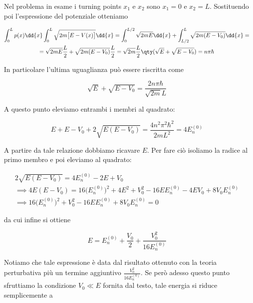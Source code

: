 \begin{soluzione}
   Nel problema in esame i turning points $x_1$ e $x_2$ sono $x_1=0$ e $x_2=L$. Sostituendo poi l'espressione del potenziale otteniamo
   
   \begin{gather*}
      \int_{0}^{L} p(x) \dd{x}
      \int_{0}^{L} \sqrt{2m \bigl[ E - V(x) \bigr]} \dd{x}
      =\int_{0}^{L/2} \sqrt{2mE} \dd{x} + \int_{L/2}^{L} \sqrt{2m(E - V_0)} \dd{x}
      =\\
      =\sqrt{2mE} \frac{L}{2} + \sqrt{2m(E - V_0)} \frac{L}{2}
      =\sqrt{2m} \frac{L}{2} \qty( \sqrt{E} + \sqrt{E - V_0} )
      =n \pi \hbar
   \end{gather*}

   In particolare l'ultima uguaglianza può essere riscritta come

   \begin{equation*}
      \sqrt{E} + \sqrt{E - V_0}
      =\frac{2 n \pi \hbar}{\sqrt{2m} L}
   \end{equation*}

   A questo punto eleviamo entrambi i membri al quadrato:

   \begin{equation*}
      E + E - V_0 + 2\sqrt{E(E - V_0)}
      =\frac{4 n^2 \pi^2 \hbar^2}{2 m L^2}
      =4 E_n^{(0)}
   \end{equation*}

   A partire da tale relazione dobbiamo ricavare $E$. Per fare ciò isoliamo la radice al primo membro e poi eleviamo al quadrato:

   \begin{gather*}
      2\sqrt{E(E - V_0)}
      =4 E_n^{(0)} - 2E + V_0
      \\
      \implies
      4E(E - V_0)
      =16 \bigl( E_n^{(0)} \bigr)^2 + 4E^2 + V_0^2 - 16 E E_n^{(0)} - 4EV_0 + 8 V_0 E_n^{(0)}
      \\
      \implies
      16 \bigl( E_n^{(0)} \bigr)^2 + V_0^2 - 16 E E_n^{(0)} + 8 V_0 E_n^{(0)}=0
   \end{gather*}

   da cui infine si ottiene

   \begin{equation*}
      E=E_n^{(0)} + \frac{V_0}{2} + \frac{V_0^2}{16 E_n^{(0)}}
   \end{equation*}

   Notiamo che tale espressione è data dal risultato ottenuto con la teoria perturbativa più un termine aggiuntivo $\frac{V_0^2}{16 E_n^{(0)}}$. Se però adesso questo punto sfruttiamo la condizione $V_0 \ll E$ fornita dal testo, tale energia si riduce semplicemente a


\end{soluzione}
